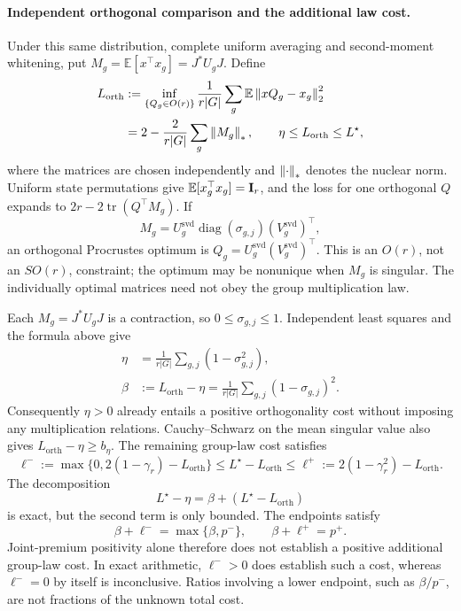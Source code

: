 \paragraph{Independent orthogonal comparison and the additional law cost.}
Under this same distribution, complete uniform averaging and second-moment whitening, put $M_g=\mathbb E[x^\top x_g]=J^*U_gJ$. Define
\begin{equation}
 \begin{aligned}
 L_{\mathrm{orth}}
 &:=\inf_{\{Q_g\in O(r)\}}\frac1{r|G|}\sum_g
       \mathbb E\left\lVert xQ_g-x_g\right\rVert_2^2\\
 &=2-\frac2{r|G|}\sum_g\left\lVert M_g\right\rVert_*,
 \qquad \eta\le L_{\mathrm{orth}}\le L^\star,
 \end{aligned}
 \label{sp:orthogonal-comparator}
\end{equation}
where the matrices are chosen independently and $\left\lVert \cdot\right\rVert_*$ denotes the nuclear norm. Uniform state permutations give $\mathbb E[x_g^\top x_g]=\mathbf{I}_r$, and the loss for one orthogonal $Q$ expands to $2r-2\operatorname{tr}(Q^\top M_g)$. If
\[
 M_g
 =
 U_g^{\mathrm{svd}}
 \operatorname{diag}(\sigma_{g,j})
 (V_g^{\mathrm{svd}})^\top,
\]
an orthogonal Procrustes optimum is $Q_g=U_g^{\mathrm{svd}}(V_g^{\mathrm{svd}})^\top$. This is an $O(r)$, not an $SO(r)$, constraint; the optimum may be nonunique when $M_g$ is singular. The individually optimal matrices need not obey the group multiplication law.

Each $M_g=J^*U_gJ$ is a contraction, so $0\le\sigma_{g,j}\le1$. Independent least squares and the formula above give
\[
 \begin{aligned}
 \eta
 &=
 \frac1{r|G|}
 \sum_{g,j}(1-\sigma_{g,j}^2),
 \\
 \beta
 &:=
 L_{\mathrm{orth}}-\eta
 =
 \frac1{r|G|}
 \sum_{g,j}(1-\sigma_{g,j})^2.
 \end{aligned}
\]
Consequently $\eta>0$ already entails a positive orthogonality cost without imposing any multiplication relations. Cauchy--Schwarz on the mean singular value also gives $L_{\mathrm{orth}}-\eta\ge b_\eta$. The remaining group-law cost satisfies
\[
 \ell^-:=\max\{0,2(1-\gamma_r)-L_{\mathrm{orth}}\}
 \le L^\star-L_{\mathrm{orth}}
 \le\ell^+:=2(1-\gamma_r^2)-L_{\mathrm{orth}}.
\]
The decomposition
\[
 L^\star-\eta=\beta+(L^\star-L_{\mathrm{orth}})
\]
is exact, but the second term is only bounded. The endpoints satisfy
\[
 \beta+\ell^-=\max\{\beta,p^-\},\qquad
 \beta+\ell^+=p^+.
\]
Joint-premium positivity alone therefore does not establish a positive additional group-law cost. In exact arithmetic, $\ell^->0$ does establish such a cost, whereas $\ell^-=0$ by itself is inconclusive. Ratios involving a lower endpoint, such as $\beta/p^-$, are not fractions of the unknown total cost.

